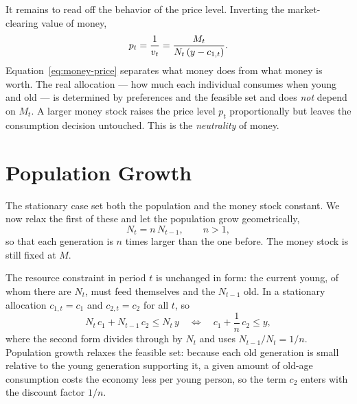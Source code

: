 
It remains to read off the behavior of the price level. Inverting the market-clearing value of money,
\begin{equation}
p_t = \frac{1}{v_t} = \frac{M_t}{N_t\left(y - c_{1,t}\right)}.
\label{eq:money-price}
\end{equation}
Equation~\eqref{eq:money-price} separates what money does from what money is worth. The real allocation --- how much each individual consumes when young and old --- is determined by preferences and the feasible set and does \emph{not} depend on $M_t$. A larger money stock raises the price level $p_t$ proportionally but leaves the consumption decision untouched. This is the \emph{neutrality} of money.


\section{Population Growth}

The stationary case set both the population and the money stock constant. We now relax the first of these and let the population grow geometrically,
\[
N_t = n\, N_{t-1}, \qquad n > 1,
\]
so that each generation is $n$ times larger than the one before. The money stock is still fixed at $M$.

The resource constraint in period $t$ is unchanged in form: the current young, of whom there are $N_t$, must feed themselves and the $N_{t-1}$ old. In a stationary allocation $c_{1,t} = c_1$ and $c_{2,t} = c_2$ for all $t$, so
\[
N_t\, c_1 + N_{t-1}\, c_2 \le N_t\, y
\quad\Longleftrightarrow\quad
c_1 + \frac{1}{n}\, c_2 \le y,
\]
where the second form divides through by $N_t$ and uses $N_{t-1}/N_t = 1/n$. Population growth relaxes the feasible set: because each old generation is small relative to the young generation supporting it, a given amount of old-age consumption costs the economy less per young person, so the term $c_2$ enters with the discount factor $1/n$.

